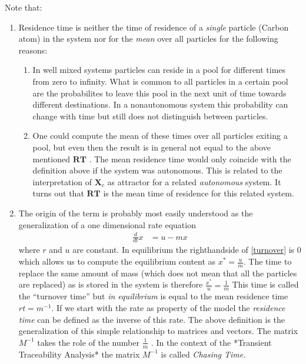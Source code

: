 \documentclass[journal abbreviation, manuscript]{copernicus}
\theoremstyle{definition}
\newcommand{\X}{\mathbf{X}}
\newcommand{\RT}{\mathbf{RT}}
\begin{document}
Note that: 
\begin{enumerate}
\item
Residence time is neither the time of residence of a \emph{single} particle (Carbon atom) in the system nor for the \emph{mean} over all particles for the following reasons:
\begin{enumerate}
  \item 
  In well mixed systems particles can reside in a pool for different times from zero to infinity. What is common to all particles in a certain pool are the probabilites to leave this pool in the next unit of time towards different destinations. In a nonautonomous system this probability can change with time but still does not distinguish between particles.
  \item 
  One could compute the mean of these times over all particles exiting a pool, but even then the result is in general not equal to the above mentioned $\RT$ \citet{Rasmussen2016JMB,Metzler2018PNAS}.
  The mean residence time would only coincide with the definition above if the system was autonomous.
  This is related to the interpretation of $\X_c$ as attractor for a related \emph{autonomous} system. It turns out that $\RT$ is the mean time of residence for this related system. 
\end{enumerate}
\item
The origin of the term is probably most easily understood as the generalization of a one dimensional rate equation 
\begin{align}
\label{turnover}
\frac{d}{dt} x &= u - m x  
\end{align}
where $r$ and $u$ are constant.
In equilibrium the righthandside of \eqref{turnover} is $0$ which allows us to compute the equilibrium content as $x^*=\frac{u}{m}$. 
The time to replace the same amount of mass (which does not mean that all the particles are replaced)  as is stored in the system is therefore 
$\frac{x^*}{u}=\frac{1}{m}$ 
This time is called the ``turnover time'' but \emph{in equilibrium} is equal to the mean residence time $rt= m^{-1}$. 
If we start with the rate as property of the model the {\it residence time} 
can be defined as the inverse of this rate. The above definition is the generalization of this simple relationship to 
matrices and vectors.
The matrix $M^{-1}$ takes the role of the number $\frac{1}{m}$ . 
In the context of the *Transient Traceability Analysis* the matrix $M^{-1}$ is called \it{Chasing Time}. 

\end{enumerate}
\end{document}

